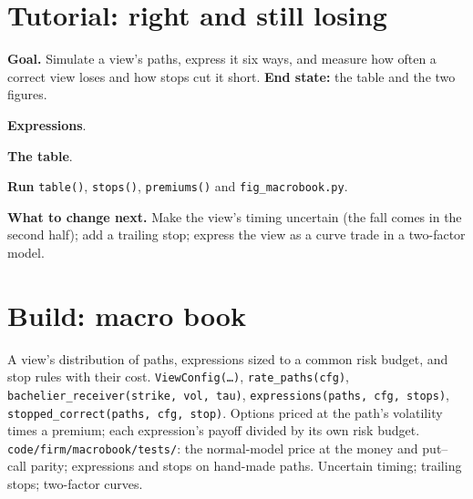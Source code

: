 \section{Tutorial: right and still losing}\label{tut:s2:discretionary-macro:tut}

\begin{tutorial}
\textbf{Goal.} Simulate a view's paths, express it six ways, and measure how often a correct view loses and how stops cut it short.
\textbf{End state:} the table and the two figures.
\begin{tutsteps}
\item \textbf{Expressions}.
\label{lst:s2:discretionary-macro:expressions}
\item \textbf{The table}.
\label{lst:s2:discretionary-macro:table}
\item \textbf{Run} \texttt{table()}, \texttt{stops()}, \texttt{premiums()} and \texttt{fig\_macrobook.py}.
\end{tutsteps}
\textbf{What to change next.} Make the view's timing uncertain (the fall comes in the second half); add a trailing stop; express the view as a
curve trade in a two-factor model.
\end{tutorial}

\section{Build: macro book}\label{bld:s2:discretionary-macro:macrobook}

\begin{build}
 A view's distribution of paths, expressions sized to a common risk budget, and stop rules with their cost.
 \texttt{ViewConfig(\dots)}, \texttt{rate\_paths(cfg)}, \texttt{bachelier\_receiver(strike, vol, tau)},
\texttt{expressions(paths, cfg, stops)}, \texttt{stopped\_correct(paths, cfg, stop)}.
 Options priced at the path's volatility times a premium; each expression's payoff divided by its own risk budget.
 \texttt{code/firm/macrobook/tests/}: the normal-model price at the money and put--call parity; expressions and stops on
hand-made paths.
 Uncertain timing; trailing stops; two-factor curves.
\end{build}

